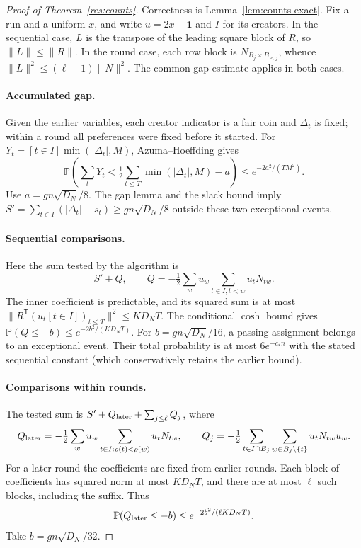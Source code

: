\documentclass[11pt,a4paper]{article}
\theoremstyle{definition}
\theoremstyle{remark}
\newcommand{\Prb}{\mathbb P}
\newcommand{\ind}{\mathbf 1}
\begin{document}
\begin{proof}[Proof of Theorem~\ref{res:counts}]
Correctness is Lemma~\ref{lem:counts-exact}. Fix a run and a uniform $x$,
and write $u=2x-\ind$ and $I$ for its creators. In the sequential case,
$L$ is the transpose of the leading square block of $R$, so $\|L\|\le\|R\|$.
In the round case, each row block is $N_{B_j\times B_{<j}}$, whence
$\|L\|^2\le(\ell-1)\|N\|^2$. The common gap estimate applies in both cases.

\paragraph{Accumulated gap.}
Given the earlier variables, each creator indicator is a fair coin and
$\Delta_t$ is fixed; within a round all preferences were fixed before it
started. For $Y_t=[t\in I]\min(|\Delta_t|,M)$, Azuma--Hoeffding gives
\[
 \Prb\left(\sum_tY_t<\tfrac12\sum_{t\le T}\min(|\Delta_t|,M)-a\right)
 \le e^{-2a^2/(TM^2)}.
\]
Use $a=gn\sqrt{D_N}/8$. The gap lemma and the slack bound imply
$S'=\sum_{t\in I}(|\Delta_t|-s_t)\ge gn\sqrt{D_N}/8$
outside these two exceptional events.

\paragraph{Sequential comparisons.}
Here the sum tested by the algorithm is
\begin{equation}
 S'+Q,\qquad Q=-\tfrac12\sum_wu_w\sum_{t\in I,t<w}u_tN_{tw}.
                                                        \label{eq:counts-race}
\end{equation}
The inner coefficient is predictable, and its squared sum is at most
$\|R^{\mathsf T}(u_t[t\in I])_{t\le T}\|^2\le KD_NT$.
The conditional $\cosh$ bound gives
$\Prb(Q\le-b)\le e^{-2b^2/(KD_NT)}$.
For $b=gn\sqrt{D_N}/16$, a passing assignment belongs to an exceptional
event. Their total probability is at most $6e^{-c_*n}$ with the stated
sequential constant (which conservatively retains the earlier bound).

\paragraph{Comparisons within rounds.}
The tested sum is $S'+Q_{\rm later}+\sum_{j\le\ell}Q_j$, where
\[
 Q_{\rm later}=-\tfrac12\sum_wu_w
        \sum_{t\in I:\rho(t)<\rho(w)}u_tN_{tw},\qquad
 Q_j=-\tfrac12\sum_{t\in I\cap B_j}\sum_{w\in B_j\setminus\{t\}}u_tN_{tw}u_w.
\]
For a later round the coefficients are fixed from earlier rounds.
Each block of coefficients has squared norm at most $KD_NT$, and there
are at most $\ell$ such blocks, including the suffix. Thus
\[
 \Prb(Q_{\rm later}\le-b)\le e^{-2b^2/(\ell KD_NT)}.
\]
Take $b=gn\sqrt{D_N}/32$.


\end{proof}
\end{document}
